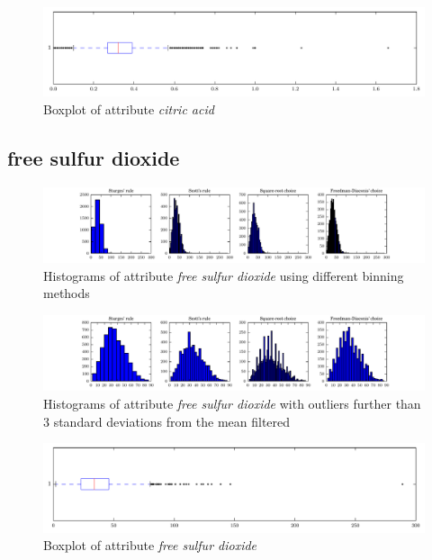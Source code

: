 \documentclass{report}
\begin{document}
\begin{figure}[H]
\includegraphics[width=\textwidth]{boxplots/citric_acid.pdf}
\caption{Boxplot of attribute \emph{citric acid}}\end{figure}

\newpage\subsection{free sulfur dioxide}
\begin{figure}[H]
\includegraphics[width=\textwidth]{histograms/free_sulfur_dioxide.pdf}
\caption{Histograms of attribute \emph{free sulfur dioxide} using different binning methods}\end{figure}

\begin{figure}[H]
\includegraphics[width=\textwidth]{histograms/free_sulfur_dioxide_filtered.pdf}
\caption{Histograms of attribute \emph{free sulfur dioxide} with outliers further than 3 standard deviations from the mean filtered}\n\end{figure}

\begin{figure}[H]
\includegraphics[width=\textwidth]{boxplots/free_sulfur_dioxide.pdf}
\caption{Boxplot of attribute \emph{free sulfur dioxide}}\end{figure}
\end{document}
